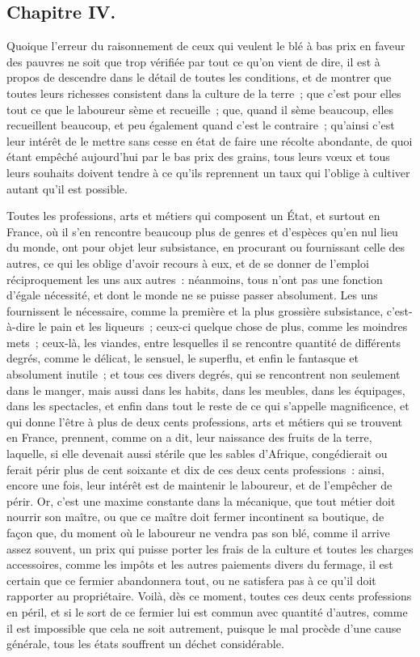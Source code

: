 \documentclass[french,twoside]{book} %
\begin{document}
\subsection[{Chapitre IV.}]{Chapitre IV.}
\noindent Quoique l’erreur du raisonnement de ceux qui veulent le blé à bas prix en faveur des pauvres ne soit que trop vérifiée par tout ce qu’on vient de dire, il est à propos de descendre dans le détail de toutes les conditions, et de montrer que toutes leurs richesses consistent dans la culture de la terre ; que c’est pour elles tout ce que le laboureur sème et recueille ; que, quand il sème beaucoup, elles recueillent beaucoup, et peu également quand c’est le contraire ; qu’ainsi c’est leur intérêt de le mettre sans cesse en état de faire une récolte abondante, de quoi étant empêché aujourd’hui par le bas prix des grains, tous leurs vœux et tous leurs souhaits doivent tendre à ce qu’ils reprennent un taux qui l’oblige à cultiver autant qu’il est possible.\par
Toutes les professions, arts et métiers qui composent un État, et surtout en France, où il s’en rencontre beaucoup plus de genres et d’espèces qu’en nul lieu du monde, ont pour objet leur subsistance, en procurant ou fournissant celle des autres, ce qui les oblige d’avoir recours à eux, et de se donner de l’emploi réciproquement les uns aux autres : néanmoins, tous n’ont pas une fonction d’égale nécessité, et dont le monde ne se puisse passer absolument. Les uns fournissent le nécessaire, comme la première et la plus grossière subsistance, c’est-à-dire le pain et les liqueurs ; ceux-ci quelque chose de plus, comme les moindres mets ; ceux-là, les viandes, entre lesquelles il se rencontre quantité de différents degrés, comme le délicat, le sensuel, le superflu, et enfin le fantasque et absolument inutile ; et tous ces divers degrés, qui se rencontrent non seulement dans le manger, mais aussi dans les habits, dans les meubles, dans les équipages, dans les spectacles, et enfin dans tout le reste de ce qui s’appelle magnificence, et qui donne l’être à plus de deux cents professions, arts et métiers qui se trouvent en France, prennent, comme on a dit, leur naissance des fruits de la terre, laquelle, si elle devenait aussi stérile que les sables d’Afrique, congédierait ou ferait périr plus de cent soixante et dix de ces deux cents professions : ainsi, encore une fois, leur intérêt est de maintenir le laboureur, et de l’empêcher de périr. Or, c’est une maxime constante dans la mécanique, que tout métier doit nourrir son maître, ou que ce maître doit fermer incontinent sa boutique, de façon que, du moment où le laboureur ne vendra pas son blé, comme il arrive assez souvent, un prix qui puisse porter les frais de la culture et toutes les charges accessoires, comme les impôts et les autres paiements divers du fermage, il est certain que ce fermier abandonnera tout, ou ne satisfera pas à ce qu’il doit rapporter au propriétaire. Voilà, dès ce moment, toutes ces deux cents professions en péril, et si le sort de ce fermier lui est commun avec quantité d’autres, comme il est impossible que cela ne soit autrement, puisque le mal procède d’une cause générale, tous les états souffrent un déchet considérable.\par
\end{document}
